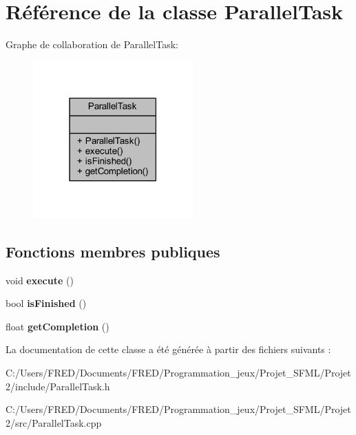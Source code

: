 \hypertarget{class_parallel_task}{}\section{Référence de la classe Parallel\+Task}
\label{class_parallel_task}


Graphe de collaboration de Parallel\+Task\+:\nopagebreak
\begin{figure}[H]
\begin{center}
\leavevmode
\includegraphics[width=174pt]{class_parallel_task__coll__graph}
\end{center}
\end{figure}
\subsection*{Fonctions membres publiques}
\begin{DoxyCompactItemize}
\item 
void {\bfseries execute} ()\hypertarget{class_parallel_task_ad1e7ba9134cc7961ab178a2f47cf54be}{}\label{class_parallel_task_ad1e7ba9134cc7961ab178a2f47cf54be}

\item 
bool {\bfseries is\+Finished} ()\hypertarget{class_parallel_task_a1a67f547aa382fac2087184b2eb19148}{}\label{class_parallel_task_a1a67f547aa382fac2087184b2eb19148}

\item 
float {\bfseries get\+Completion} ()\hypertarget{class_parallel_task_ada45e4db1aa8a89f20ab0b8662c6dabc}{}\label{class_parallel_task_ada45e4db1aa8a89f20ab0b8662c6dabc}

\end{DoxyCompactItemize}


La documentation de cette classe a été générée à partir des fichiers suivants \+:\begin{DoxyCompactItemize}
\item 
C\+:/\+Users/\+F\+R\+E\+D/\+Documents/\+F\+R\+E\+D/\+Programmation\+\_\+jeux/\+Projet\+\_\+\+S\+F\+M\+L/\+Projet2/include/Parallel\+Task.\+h\item 
C\+:/\+Users/\+F\+R\+E\+D/\+Documents/\+F\+R\+E\+D/\+Programmation\+\_\+jeux/\+Projet\+\_\+\+S\+F\+M\+L/\+Projet2/src/Parallel\+Task.\+cpp\end{DoxyCompactItemize}

